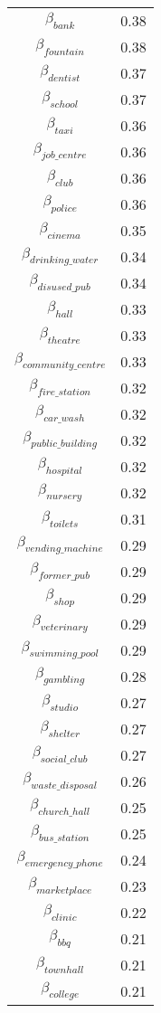 \begin{tabular}{c|c}
$\beta_{bank}$ & 0.38 \\
$\beta_{fountain}$ & 0.38 \\
$\beta_{dentist}$ & 0.37 \\
$\beta_{school}$ & 0.37 \\
$\beta_{taxi}$ & 0.36 \\
$\beta_{job\_centre}$ & 0.36 \\
$\beta_{club}$ & 0.36 \\
$\beta_{police}$ & 0.36 \\
$\beta_{cinema}$ & 0.35 \\
$\beta_{drinking\_water}$ & 0.34 \\
$\beta_{disused\_pub}$ & 0.34 \\
$\beta_{hall}$ & 0.33 \\
$\beta_{theatre}$ & 0.33 \\
$\beta_{community\_centre}$ & 0.33 \\
$\beta_{fire\_station}$ & 0.32 \\
$\beta_{car\_wash}$ & 0.32 \\
$\beta_{public\_building}$ & 0.32 \\
$\beta_{hospital}$ & 0.32 \\
$\beta_{nursery}$ & 0.32 \\
$\beta_{toilets}$ & 0.31 \\
$\beta_{vending\_machine}$ & 0.29 \\
$\beta_{former\_pub}$ & 0.29 \\
$\beta_{shop}$ & 0.29 \\
$\beta_{veterinary}$ & 0.29 \\
$\beta_{swimming\_pool}$ & 0.29 \\
$\beta_{gambling}$ & 0.28 \\
$\beta_{studio}$ & 0.27 \\
$\beta_{shelter}$ & 0.27 \\
$\beta_{social\_club}$ & 0.27 \\
$\beta_{waste\_disposal}$ & 0.26 \\
$\beta_{church\_hall}$ & 0.25 \\
$\beta_{bus\_station}$ & 0.25 \\
$\beta_{emergency\_phone}$ & 0.24 \\
$\beta_{marketplace}$ & 0.23 \\
$\beta_{clinic}$ & 0.22 \\
$\beta_{bbq}$ & 0.21 \\
$\beta_{townhall}$ & 0.21 \\
$\beta_{college}$ & 0.21 \\

\end{tabular}
